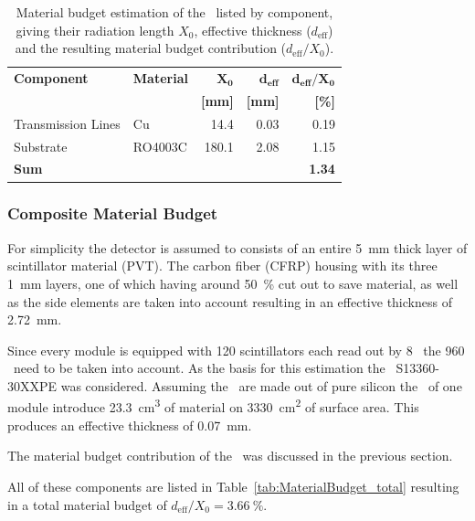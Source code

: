 \documentclass[../BTOF_summary.tex]{subfiles}
\begin{document}
\begin{table}[htbp]
\centering
\caption[Material budget estimation of the \railboard .]{Material budget estimation of the \railboard\ listed by component, giving their radiation length $X_0$, effective thickness ($d_\text{eff}$) and the resulting material budget contribution ($d_{\text{eff}} / X_0$).}
\label{tab:MaterialBudget_Railboard}
\begin{tabular}{@{}llrrr@{}}
\toprule
\textbf{Component} & \textbf{Material} & $\mathbf{X_0}$ & $\mathbf{d_{eff}}$ & $\mathbf{d_{eff}/X_{0}}$ \\
                   & \textbf{}         & \textbf{[mm]}  & \textbf{[mm]}      & \textbf{[\%]}            \\ \midrule
Transmission Lines & Cu      & 14.4   & 0.03  & 0.19      \\
Substrate          & RO4003C & 180.1  & 2.08  & 1.15      \\ \midrule
\textbf{Sum}       &				      &                &                    & \textbf{1.34}            \\ \bottomrule
\end{tabular}
\end{table}


\subsubsection*{Composite Material Budget}
For simplicity the detector is assumed to consists of an entire \SI{5}{mm} thick layer of scintillator material (PVT).
The carbon fiber (CFRP) housing with its three \SI{1}{mm} layers, one of which having around \SI{50}{\percent} cut out to save material, as well as the side elements are taken into account resulting in an effective thickness of \SI{2.72}{mm}.

Since every module is equipped with 120 scintillators each read out by 8 \sipms\ the 960 \sipms\ need to be taken into account. As the basis for this estimation the \hamamatsu\ S13360-30XXPE was considered. %
Assuming the \sipms\ are made out of pure silicon the \sipms\ of one module introduce \SI{23.3}{cm^3} of material on \SI{3330}{cm^2} of surface area. This produces an effective thickness of \SI{0.07}{mm}.

The material budget contribution of the \railboard\ was discussed in the previous section.

All of these components are listed in Table~\ref{tab:MaterialBudget_total} resulting in a total material budget of $d_{\text{eff}} / X_0 = \SI{3.66}{\percent}$.
\end{document}
